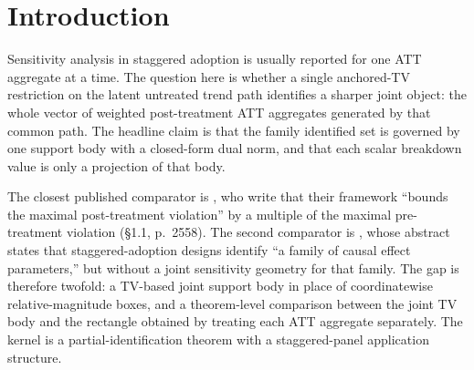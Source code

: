 \documentclass[11pt]{article}
\newcommand{\transpose}{\mathsf{T}}
\newcommand{\R}{\mathbb{R}}
\theoremstyle{definition}
\theoremstyle{plain}
\theoremstyle{remark}
\begin{document}
\begin{abstract}
Staggered-adoption sensitivity analyses usually report one ATT aggregate at a time, even though the same latent post-treatment trend discrepancy path perturbs every weighted aggregate simultaneously. This proposal asks for the sharp identified set of a finite family of weighted post-treatment ATT functionals when that common discrepancy path is restricted by an anchored total-variation budget calibrated to the observed pre-treatment path. The routine claim is a joint support-body theorem: the family identified set is the image of one anchored-TV ball, and its support in any direction \(a\in\R^K\) is a closed form \( \kappa V_{\mathrm{pre}}(g)\Gamma_{\mathrm{TV}}(W_\Lambda^\transpose a)\). A scalar ATET interval and its sign-loss frontier are then projections of the same body rather than separate sensitivity calculations. The flagship conjecture is that, outside a thin coordinate-separable locus of weight families, this joint TV body is generically a strict subset of the coordinatewise Rambachan--Roth relative-magnitude rectangle and has a different exposed-face geometry. If resolved, the result would make sensitivity reporting for staggered designs a multi-target identified-set object rather than a list of unrelated one-dimensional robustness numbers.
\end{abstract}

\section{Introduction}
Sensitivity analysis in staggered adoption is usually reported for one ATT aggregate at a time. The question here is whether a single anchored-TV restriction on the latent untreated trend path identifies a sharper joint object: the whole vector of weighted post-treatment ATT aggregates generated by that common path. The headline claim is that the family identified set is governed by one support body with a closed-form dual norm, and that each scalar breakdown value is only a projection of that body.

The closest published comparator is \citet{RambachanRoth2023CrediblePT}, who write that their framework ``bounds the maximal post-treatment violation'' by a multiple of the maximal pre-treatment violation (\S1.1, p.~2558). The second comparator is \citet{CallawaySantAnna2021MultiplePeriods}, whose abstract states that staggered-adoption designs identify ``a family of causal effect parameters,'' but without a joint sensitivity geometry for that family. The gap is therefore twofold: a TV-based joint support body in place of coordinatewise relative-magnitude boxes, and a theorem-level comparison between the joint TV body and the rectangle obtained by treating each ATT aggregate separately. The kernel is a partial-identification theorem with a staggered-panel application structure.
\end{document}
